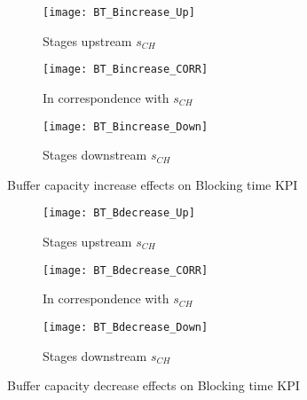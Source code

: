 \begin{landscape}
\begin{figure}[p]
  \centering
  \begin{subfigure}[t]{0.4\textwidth}
    \texttt{[image: BT\_Bincrease\_Up]}
    \caption{Stages upstream $s_{CH}$}
    \label{fig:Buffer capacity increase effects on Blocking time KPI - Stages upstream}   
  \end{subfigure}
  \begin{subfigure}[t]{0.4\textwidth}
    \texttt{[image: BT\_Bincrease\_CORR]}
    \caption{In correspondence with $s_{CH}$}
    \label{fig:Buffer capacity increase effects on Blocking time KPI - In correspondence with}   
  \end{subfigure}
  \begin{subfigure}[t]{0.4\textwidth}
    \texttt{[image: BT\_Bincrease\_Down]}
    \caption{Stages downstream $s_{CH}$}
    \label{fig:Buffer capacity increase effects on Blocking time KPI - Stages downstream}   
  \end{subfigure}
  \caption{Buffer capacity increase effects on Blocking time KPI}
  \label{fig:Buffer capacity increase effects on Blocking time KPI}
\end{figure}
\begin{figure}[p]
  \centering
  \begin{subfigure}[b]{0.4\textwidth}
    \texttt{[image: BT\_Bdecrease\_Up]}
    \caption{Stages upstream $s_{CH}$}
    \label{fig:Buffer capacity decrease effects on Blocking time KPI - Stages upstream}   
  \end{subfigure}
  \begin{subfigure}[b]{0.4\textwidth}
    \texttt{[image: BT\_Bdecrease\_CORR]}
    \caption{In correspondence with $s_{CH}$}
    \label{fig:Buffer capacity decrease effects on Blocking time KPI - In correspondence with}   
  \end{subfigure}
  \begin{subfigure}[b]{0.4\textwidth}
    \texttt{[image: BT\_Bdecrease\_Down]}
    \caption{Stages downstream $s_{CH}$}
    \label{fig:Buffer capacity decrease effects on Blocking time KPI - Stages downstream}   
  \end{subfigure}
  \caption{Buffer capacity decrease effects on Blocking time KPI}
  \label{fig:Buffer capacity decrease effects on Blocking time KPI}
\end{figure}
\end{landscape}
